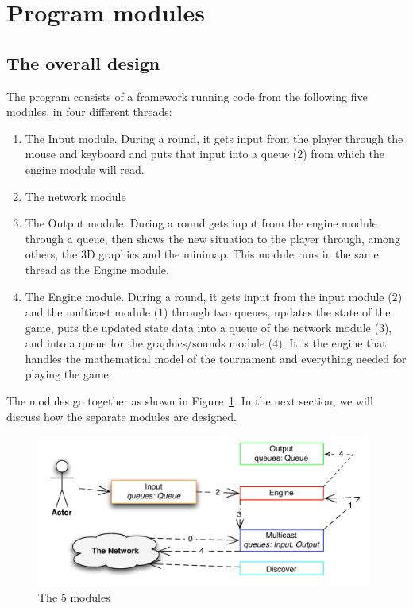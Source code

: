 \section{Program modules} %
\label{sec:program_modules}

  \subsection{The overall design} %
  \label{sub:design}
    The program consists of a framework running code from the following five modules, in four different threads:

    \begin{enumerate}
      \item The Input module. During a round, it gets input from the player through the mouse and keyboard and puts that input into a queue ($2$) from which the engine module will read.
      
      \item The network module 
      
      \item The Output module. During a round gets input from the engine module through a queue, then shows the new situation to the player through, among others, the 3D graphics and the minimap. This module runs in the same thread as the Engine module.
      \item The Engine module. During a round, it gets input from the input module ($2$) and the multicast module ($1$) through two queues, updates the state of the game, puts the updated state data into a queue of the network module ($3$), and into a queue for the graphics/sounds module ($4$). It is the engine that handles the mathematical model of the tournament and everything needed for playing the game.
    \end{enumerate}

    The modules go together as shown in Figure~\ref{fig:modules}. In the next section, we will discuss how the separate modules are designed.\\

    \begin{figure}[!ht]
      \centering
      \includegraphics[width=11cm,height=5cm]{diagrams/modules}
      \caption{The 5 modules} \label{fig:modules}
    \end{figure}

